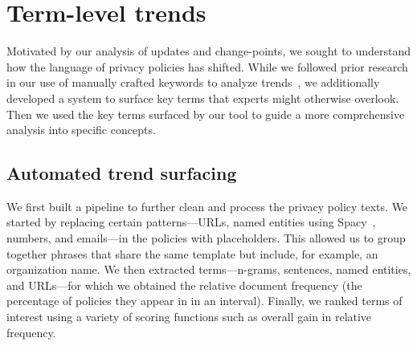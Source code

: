 \section{Term-level trends}
\label{sec:ppot:analysis}

Motivated by our analysis of updates and change-points, we sought to understand how the language of privacy policies has shifted. While we followed prior research in our use of manually crafted keywords to analyze trends~\cite{degeling2018we},
we additionally developed a system to surface key terms that experts might otherwise overlook. Then we used the key terms surfaced by our tool to guide a more comprehensive analysis into specific concepts.

\subsection{Automated trend surfacing}
\label{sec:ppot:automated-trends}

We first built a pipeline to further clean and process the privacy policy texts. We started by replacing certain patterns---URLs, named entities using Spacy~\cite{spacy}, numbers, and emails---in the policies with placeholders. This allowed us to group together phrases that share the same template but include, for example, an organization name. We then extracted terms---n-grams, sentences, named entities, and URLs---for which we obtained the relative document frequency (the percentage of policies they appear in in an interval). Finally, we ranked terms of interest using a variety of scoring functions such as overall gain in relative frequency. 


